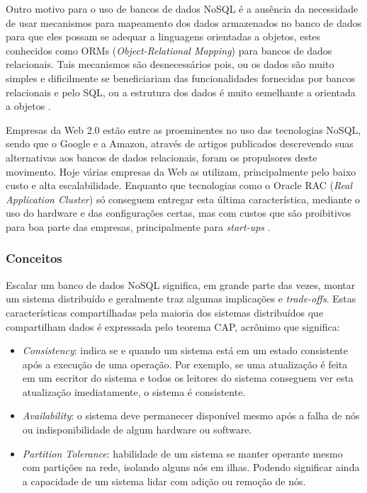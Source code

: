 \documentclass[diss]{template/setrem}
\begin{document}
Outro motivo para o uso de bancos de dados NoSQL é a ausência da necessidade de usar mecanismos para mapeamento dos dados armazenados no banco de dados para que eles possam se adequar a linguagens orientadas a objetos, estes conhecidos como ORMs (\emph{Object-Relational Mapping}) para bancos de dados relacionais. Tais mecanismos são desnecessários pois, ou os dados são muito simples e dificilmente se beneficiariam das funcionalidades fornecidas por bancos relacionais e pelo SQL, ou a estrutura dos dados é muito semelhante a orientada a objetos \citep{Strauch2011}.

Empresas da Web 2.0 estão entre as proeminentes no uso das tecnologias NoSQL, sendo que o Google e a Amazon, através de artigos publicados descrevendo suas alternativas aos bancos de dados relacionais, foram os propulsores deste movimento. Hoje várias empresas da Web as utilizam, principalmente pelo baixo custo e alta escalabilidade. Enquanto que tecnologias como o Oracle RAC (\emph{Real Application Cluster}) só conseguem entregar esta última característica, mediante o uso do hardware e das configurações certas, mas com custos que são proibitivos para boa parte das empresas, principalmente para \emph{start-ups} \citep{Strauch2011}.

\subsubsection{Conceitos}
Escalar um banco de dados NoSQL significa, em grande parte das vezes, montar um sistema distribuído e geralmente traz algumas implicações e \emph{trade-offs}. Estas características compartilhadas pela maioria dos sistemas distribuídos que compartilham dados é expressada pelo teorema CAP, acrônimo que significa:
\begin{itemize}
	\item \emph{Consistency}: indica se e quando um sistema está em um estado consistente após a execução de uma operação. Por exemplo, se uma atualização é feita em um escritor do sistema e todos os leitores do sistema conseguem ver esta atualização imediatamente, o sistema é consistente.
	\item \emph{Availability}: o sistema deve permanecer disponível mesmo após a falha de nós ou indisponibilidade de algum hardware ou software.
	\item \emph{Partition Tolerance}: habilidade de um sistema se manter operante mesmo com partições na rede, isolando alguns nós em ilhas. Podendo significar ainda a capacidade de um sistema lidar com adição ou remoção de nós.
\end{itemize}
\end{document}
